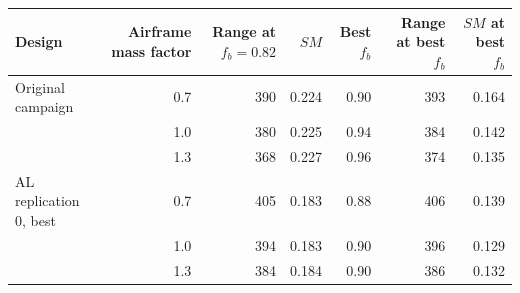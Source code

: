 \begin{tabular}{@{}lrrrrrr@{}}
\toprule
Design & Airframe mass factor & Range at $f_b=0.82$ & $SM$ & Best $f_b$ & Range at best $f_b$ & $SM$ at best $f_b$ \\
\midrule
Original campaign & 0.7 & 390 & 0.224 & 0.90 & 393 & 0.164 \\
 & 1.0 & 380 & 0.225 & 0.94 & 384 & 0.142 \\
 & 1.3 & 368 & 0.227 & 0.96 & 374 & 0.135 \\
\midrule
AL replication 0, best & 0.7 & 405 & 0.183 & 0.88 & 406 & 0.139 \\
 & 1.0 & 394 & 0.183 & 0.90 & 396 & 0.129 \\
 & 1.3 & 384 & 0.184 & 0.90 & 386 & 0.132 \\
\bottomrule
\end{tabular}
